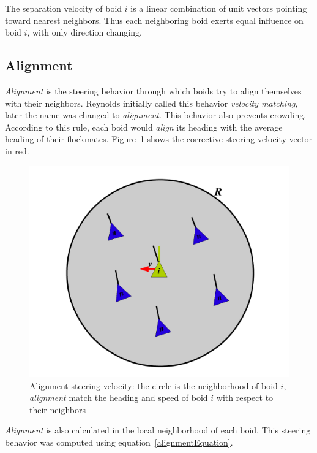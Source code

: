 The separation velocity of boid $i$ is a linear combination of unit vectors pointing toward nearest neighbors. Thus each neighboring boid exerts equal influence on boid $i$, with only direction changing. 

\subsection{Alignment}
\textit{Alignment} is the steering behavior through which boids try to align themselves with their neighbors. Reynolds initially called this behavior \textit{velocity matching}, later the name was changed to \textit{alignment}. This behavior also prevents crowding. According to this rule, each boid would \textit{align} its heading with the average heading of their flockmates. Figure~\ref{alignmentPDF} shows the corrective steering velocity vector in red.

\begin{figure}[htbp]
\begin{center}
\includegraphics[scale=0.6]{figures/alignment.pdf}
\caption{Alignment steering velocity: the circle is the neighborhood of boid $i$, \textit{alignment} match the heading and speed of boid $i$ with respect to their neighbors}
\label{alignmentPDF}
\end{center}
\end{figure}

\textit{Alignment} is also calculated in the local neighborhood of each boid. This steering behavior was computed using equation~\ref{alignmentEquation}.

